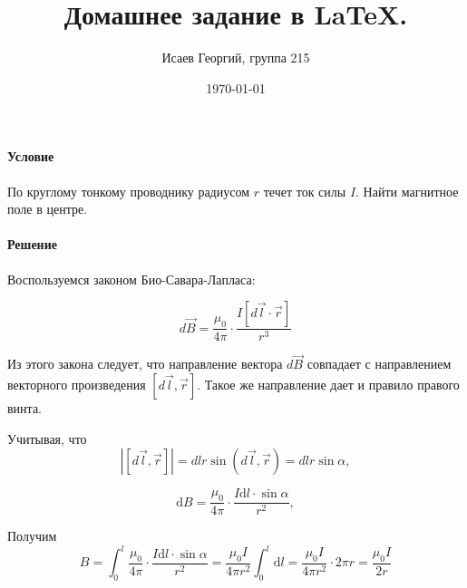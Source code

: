 \documentclass[a4paper]{article}
\title{Домашнее задание в \LaTeX.}
\author{Исаев Георгий, группа 215}
\date{\today}
\begin{document}
\maketitle


\paragraph{Условие}
По круглому тонкому проводнику радиусом $r$ течет ток силы $I$. 
Найти магнитное поле в центре.

\paragraph{Решение}
Воспользуемся законом Био-Савара-Лапласа:

\begin{equation}
    d\vec{B} = \frac{\mu_0}{4\pi} \cdot \frac{I\left[d\vec{l} \cdot \vec{r}\right]}{r^3}
\end{equation}

Из этого закона следует, что направление вектора $d\vec{B}$ совпадает с направлением
векторного произведения $\left[d\vec{l}, \vec{r}\right]$. Такое же направление
дает и правило правого винта.

Учитывая, что
\[
    \left| \left[d\vec{l}, \vec{r}\right] \right| = dl r \sin(d\vec{l},\vec{r}) = dlr\sin\alpha,
\]

\[
    \mathrm{d}B = \frac{\mu_0}{4\pi} \cdot \frac{I\mathrm{d}l \cdot \sin\alpha}{r^2},
\]

Получим
\[
    B = \int_0^l \frac{\mu_0}{4\pi} \cdot \frac{I\mathrm{d}l \cdot \sin\alpha}{r^2} = 
    \frac{\mu_0I}{4\pi r^2} \int_0^l \mathrm{d}l = \frac{\mu_0I}{4\pi r^2} \cdot 2\pi r = 
    \frac{\mu_0I}{2r}
\]
\end{document}
